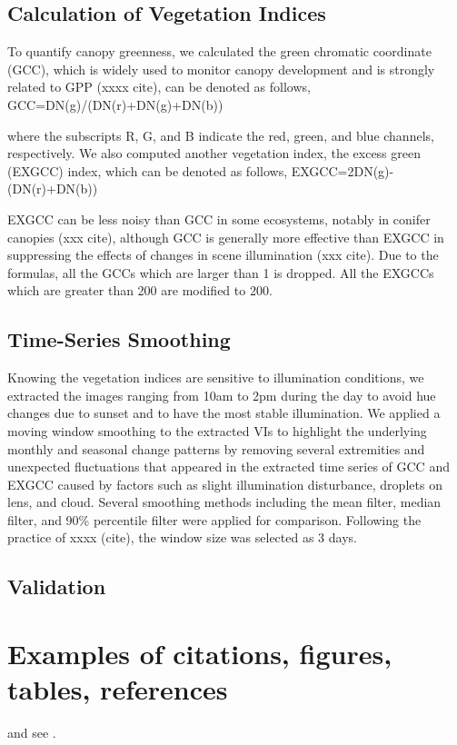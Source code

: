 \documentclass{article}
\begin{document}
\subsection{Calculation of Vegetation Indices}
To quantify canopy greenness, we calculated the green chromatic coordinate (GCC), which is widely used to monitor canopy development and is strongly related to GPP (xxxx cite), can be denoted as follows,
GCC=DN(g)/(DN(r)+DN(g)+DN(b))

where the subscripts R, G, and B indicate the red, green, and blue channels, respectively. 
We also computed another vegetation index, the excess green (EXGCC) index, which can be denoted as follows, 
EXGCC=2DN(g)-(DN(r)+DN(b)) 

EXGCC can be less noisy than GCC in some ecosystems, notably in conifer canopies (xxx cite), although GCC is generally more effective than EXGCC in suppressing the effects of changes in scene illumination (xxx cite). Due to the formulas, all the GCCs which are larger than 1 is dropped. All the EXGCCs which are greater than 200 are modified to 200. 


\subsection{Time-Series Smoothing}
Knowing the vegetation indices are sensitive to illumination conditions, we extracted the images ranging from 10am to 2pm during the day to avoid hue changes due to sunset and to have the most stable illumination. We applied a moving window smoothing to the extracted VIs to highlight the underlying monthly and seasonal change patterns by removing several extremities and unexpected fluctuations that appeared in the extracted time series of GCC and EXGCC caused by factors such as slight illumination disturbance, droplets on lens, and cloud. Several smoothing methods including the mean filter, median filter, and 90\% percentile filter were applied for comparison. Following the practice of xxxx (cite), the window size was selected as 3 days. 


\subsection{Validation}





\section{Examples of citations, figures, tables, references}
\label{sec:others}
\lipsum[8] \cite{kour2014real,kour2014fast} and see \cite{hadash2018estimate}.
\end{document}
